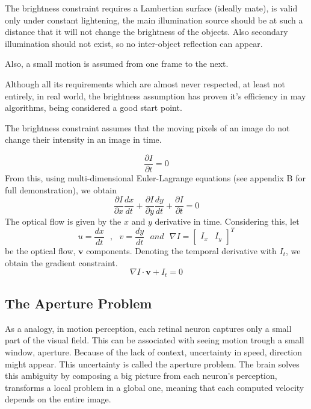 \documentclass[12pt,a4paper,twoside]{report}
\begin{document}
{The brightness constraint requires a Lambertian surface (ideally mate), is valid only under constant lightening, the main illumination source should be at such a distance that it will not change the brightness of the objects. Also secondary illumination should not exist, so no inter-object reflection can appear.

 Also, a small motion is assumed from one frame to the next. 
 
Although all its  requirements which are almost never respected, at least not entirely, in real world, the brightness assumption has proven it's efficiency in may algorithms, being considered a good start point.

The brightness constraint assumes that the moving pixels of an image do not change their intensity in an image in time.


\begin{equation}  \label{Idt0}
\frac{\partial I}{\partial t} = 0
\end{equation}
From this, using multi-dimensional Euler-Lagrange equations (see appendix B for full demonstration), we obtain
\begin{equation} \label{Idt0_lagr}
\frac{\partial I}{\partial x}\frac{dx}{dt} +
\frac{\partial I}{\partial y}\frac{dy}{dt} +
\frac{\partial I}{\partial t} = 0
\end{equation}
The optical flow is given by the $x$ and $y$ derivative in time. Considering this, let
\begin{equation}
u = \frac{dx}{dt} \ \ \ , \ \ \  v = \frac{dy}{dt} \ \ \ and \ \ \ \nabla I=\begin{bmatrix}
I_x & I_y
\end{bmatrix} ^T
\end{equation} 
be the optical flow, $\boldsymbol{v}$ components. Denoting the temporal derivative with $I_t$, we obtain the gradient constraint. 
\begin{equation}
	\nabla I \cdot \boldsymbol{v}+I_t = 0
\end{equation}


\subsection{The Aperture Problem}
As a analogy, in motion perception, each retinal neuron captures only a small part of the visual field. This can be associated with seeing motion trough a small window, aperture. Because of the lack of context, uncertainty in speed, direction might appear. This uncertainty is called the aperture problem.
The brain solves this ambiguity by composing a big picture from each neuron's perception, transforms a local problem in a global one, meaning that each computed velocity depends on the entire image.
 
}
\end{document}
